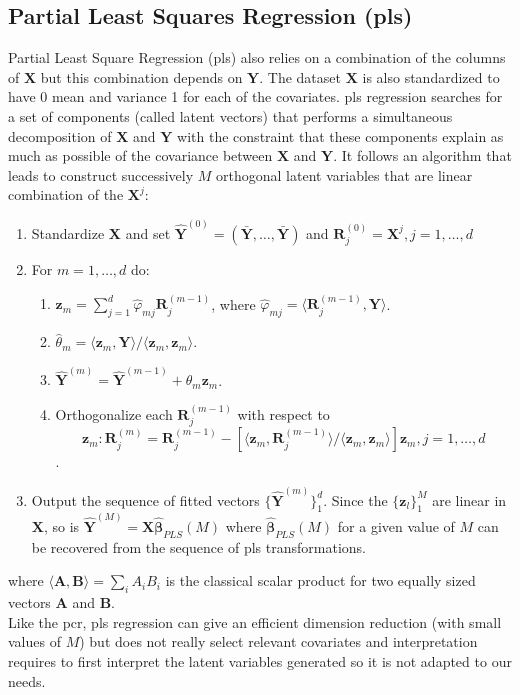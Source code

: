 \documentclass[12pt,a4paper]{report}
\begin{document}
			\subsection{Partial Least Squares Regression ({\sc pls})}

	Partial Least Square Regression ({\sc pls})\cite{abdi2003partial,geladi1986partial} also relies on a combination of the columns of  $\boldsymbol{X}$ but this combination depends on $\boldsymbol{Y}$. The dataset $\boldsymbol{X}$ is also standardized to have 0 mean and variance 1 for each of the covariates. {\sc pls} regression searches for a set
of components (called latent vectors) that performs a simultaneous decomposition of $\boldsymbol{X}$ and $\boldsymbol{Y}$ with the constraint that these components explain as much as possible of the covariance between $\boldsymbol{X}$ and $\boldsymbol{Y}$. It follows an algorithm that leads to construct successively $M$ orthogonal latent variables that are linear combination of the $\boldsymbol{X}^j$:
\begin{enumerate}
	\item Standardize $\boldsymbol{X}$ and set $\hat{\boldsymbol{Y}}^{(0)} 
	=(\bar{\boldsymbol{Y}},\dots,\bar{\boldsymbol{Y}})$ and $\boldsymbol{R}_j^{(0)}=\boldsymbol{X}^j,j=1,\dots,d$
	\item For $m=1,\dots,d$ do:
	\begin{enumerate}
		\item $\boldsymbol{z}_m=\sum_{j=1}^d \hat{\varphi}_{mj}\boldsymbol{R}_j^{(m-1)}$, where $\hat{\varphi}_{mj}=\langle \boldsymbol{R}_j^{(m-1)},\boldsymbol{Y}\rangle$.
		\item $\hat{\theta}_m= \langle \boldsymbol{z}_m,\boldsymbol{Y} \rangle / \langle \boldsymbol{z}_m,\boldsymbol{z}_m \rangle$.
		\item $\hat{\boldsymbol{Y}}^{(m)} =\hat{\boldsymbol{Y}}^{(m-1)}+\hat{\theta}_m\boldsymbol{z}_m$.
		\item Orthogonalize each $\boldsymbol{R}_j^{(m-1)}$ with respect to $$\boldsymbol{z}_m: \boldsymbol{R}_j^{(m)}=\boldsymbol{R}_j^{(m-1)}-\left[ \langle \boldsymbol{z}_m,\boldsymbol{R}_j^{(m-1)} \rangle/ \langle \boldsymbol{z}_m,\boldsymbol{z}_m \rangle \right]\boldsymbol{z}_m, j=1,\dots,d$$.
	\end{enumerate}
	\item Output the sequence of fitted vectors $\{\hat{\boldsymbol{Y}}^{(m)}\}_1^d$. Since the $\{ \boldsymbol{z}_l\}_1^M$ are linear in $\boldsymbol{X}$, so is $\hat{\boldsymbol{Y}}^{(M)}=\boldsymbol{X}\hat{\boldsymbol{\beta}}_{PLS}(M)$ where $\hat{\boldsymbol{\beta}}_{PLS}(M)$ for a given value of $M$ can be recovered from the sequence of {\sc pls} transformations.
\end{enumerate}
where $\langle \boldsymbol{A},\boldsymbol{B} \rangle=\sum_i A_iB_i$ is the classical scalar product for two equally sized vectors $\boldsymbol{A}$ and $\boldsymbol{B}$.\\
Like the {\sc pcr}, {\sc pls} regression can give an efficient dimension reduction (with small values of $M$) but does not really select relevant covariates and interpretation requires to first interpret the latent variables generated so it is not adapted to our needs.
\end{document}
